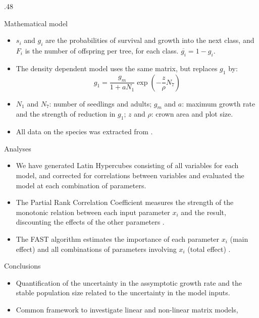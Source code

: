 \documentclass[final]{beamer}
\begin{document}
\begin{frame}{}
\begin{columns}[t]
\begin{column}{.48\linewidth}
\begin{block}{Mathematical model}
\begin{itemize}
\begin{equation}
\begin{array} {ccccccc}
0 &   0 &   0 &   0 & s_5 \cdot g_5 & s_6 \cdot \overline{g_6} &   0 \\
0 &   0 &   0 &   0 &   0 & s_6 \cdot g_6 & s_7 
\end{array}
\right]
\label{LefMatrixReparam}
\end{equation}
	   	  \item $s_i$ and $g_i$ are the probabilities of survival and growth into the next class, and $F_i$ is the number of offspring per tree, for each class. $\overline{g_i} = 1-g_i$.
		  \item The density dependent model uses the same matrix, but replaces $g_1$ by:
\begin{equation}
g_1 = \frac{ g_m }{1+ a N_1} \exp \left(- \frac{z}{\rho} N_7 \right)
\label{G_1}
\end{equation}
		  \item $N_1$ and $N_7$: number of seedlings and adults; $g_m$ and $a$: maximum growth rate and the strength of reduction in $g_1$; $z$ and $\rho$: crown area and plot size.
          \item All data on the species was extracted from \cite{SilvaMatos99}.
          \end{itemize}
        \end{block}
		\begin{block}{Analyses}
		\begin{itemize}
		\item We have generated Latin Hypercubes consisting of all variables for each model, and corrected for correlations between variables \cite{Huntington98} and evaluated the model at each combination of parameters.
		\item The Partial Rank Correlation Coefficient measures the strength of the monotonic relation between each input parameter $x_i$ and the result, discounting the effects of the other parameters \cite{Marino08}.
		\item The FAST algorithm estimates the importance of each parameter $x_i$ (main effect) and all 
		combinations of	parameters involving $x_i$ (total effect) \cite{Marino08}.
		\end{itemize}
		\end{block}
		\begin{block}{Conclusions}
		\begin{itemize}
		\item Quantification of the uncertainty in the assymptotic growth rate and the stable
		population size related to the uncertainty in the model inputs.
		\item Common framework to investigate linear and non-linear matrix models,

\end{itemize}
\end{block}
\end{column}
\end{columns}
\end{frame}
\end{document}
